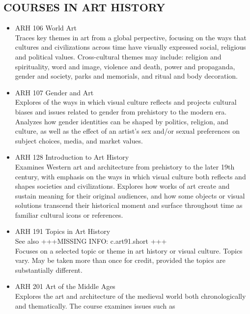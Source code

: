 \documentclass[
  letterpaper,
]{scrbook}
\providecommand{\tightlist}{%
  \setlength{\itemsep}{0pt}\setlength{\parskip}{0pt}}
\begin{document}
\subsection{COURSES IN ART HISTORY}\label{courses-in-art-history}

\begin{itemize}
\tightlist
\item
  ARH 106 World Art\\
  Traces key themes in art from a global perpective, focusing on the
  ways that cultures and civilizations across time have visually
  expressed social, religious and political values. Cross-cultural
  themes may include: religion and spirituality, word and image,
  violence and death, power and propaganda, gender and society, parks
  and memorials, and ritual and body decoration.\\
\item
  ARH 107 Gender and Art\\
  Explores of the ways in which visual culture reflects and projects
  cultural biases and issues related to gender from prehistory to the
  modern era. Analyzes how gender identities can be shaped by politics,
  religion, and culture, as well as the effect of an artist's sex and/or
  sexual preferences on subject choices, media, and market values.\\
\item
  ARH 128 Introduction to Art History\\
  Examines Western art and architecture from prehistory to the later
  19th century, with emphasis on the ways in which visual culture both
  reflects and shapes societies and civilizations. Explores how works of
  art create and sustain meaning for their original audiences, and how
  some objects or visual solutions transcend their historical moment and
  surface throughout time as familiar cultural icons or references.\\
\item
  ARH 191 Topics in Art History\\
  See also +++MISSING INFO: c.art91.short +++\\
  Focuses on a selected topic or theme in art history or visual culture.
  Topics vary. May be taken more than once for credit, provided the
  topics are substantially different.\\
\item
  ARH 201 Art of the Middle Ages\\
  Explores the art and architecture of the medieval world both
  chronologically and thematically. The course examines issues such as

\end{itemize}
\end{document}
